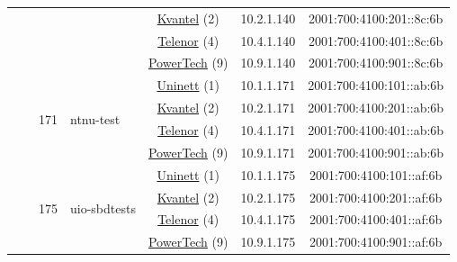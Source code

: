 \begin{small}
\begin{center}
\begin{longtable}{|c|c|c|c|c|c|c|c|}
  &  &  &  & \multicolumn{2}{|c|}{\tiny{\href{http://kvantel.no}{Kvantel} (2)}} & \tiny{10.2.1.140} & \tiny{2001:700:4100:201::8c:6b} \\* \cline{5-5}\cline{6-6}\cline{7-7}\cline{8-8}
  &  &  &  & \multicolumn{2}{|c|}{\tiny{\href{https://www.telenor.no}{Telenor} (4)}} & \tiny{10.4.1.140} & \tiny{2001:700:4100:401::8c:6b} \\* \cline{5-5}\cline{6-6}\cline{7-7}\cline{8-8}
  &  &  &  & \multicolumn{2}{|c|}{\tiny{\href{http://www.powertech.no}{PowerTech} (9)}} & \tiny{10.9.1.140} & \tiny{2001:700:4100:901::8c:6b} \\* \cline{3-3}\cline{4-4}\cline{5-5}\cline{6-6}\cline{7-7}\cline{8-8}
  &  & \multirow{4}{*}{\tiny{171}} & \multicolumn{1}{|l|}{\multirow{4}{*}{\tiny{ntnu-test}}} & \multicolumn{2}{|c|}{\tiny{\href{https://www.uninett.no}{Uninett} (1)}} & \tiny{10.1.1.171} & \tiny{2001:700:4100:101::ab:6b} \\* \cline{5-5}\cline{6-6}\cline{7-7}\cline{8-8}
  &  &  &  & \multicolumn{2}{|c|}{\tiny{\href{http://kvantel.no}{Kvantel} (2)}} & \tiny{10.2.1.171} & \tiny{2001:700:4100:201::ab:6b} \\* \cline{5-5}\cline{6-6}\cline{7-7}\cline{8-8}
  &  &  &  & \multicolumn{2}{|c|}{\tiny{\href{https://www.telenor.no}{Telenor} (4)}} & \tiny{10.4.1.171} & \tiny{2001:700:4100:401::ab:6b} \\* \cline{5-5}\cline{6-6}\cline{7-7}\cline{8-8}
  &  &  &  & \multicolumn{2}{|c|}{\tiny{\href{http://www.powertech.no}{PowerTech} (9)}} & \tiny{10.9.1.171} & \tiny{2001:700:4100:901::ab:6b} \\* \cline{3-3}\cline{4-4}\cline{5-5}\cline{6-6}\cline{7-7}\cline{8-8}
  &  & \multirow{4}{*}{\tiny{175}} & \multicolumn{1}{|l|}{\multirow{4}{*}{\tiny{uio-sbdtests}}} & \multicolumn{2}{|c|}{\tiny{\href{https://www.uninett.no}{Uninett} (1)}} & \tiny{10.1.1.175} & \tiny{2001:700:4100:101::af:6b} \\* \cline{5-5}\cline{6-6}\cline{7-7}\cline{8-8}
  &  &  &  & \multicolumn{2}{|c|}{\tiny{\href{http://kvantel.no}{Kvantel} (2)}} & \tiny{10.2.1.175} & \tiny{2001:700:4100:201::af:6b} \\* \cline{5-5}\cline{6-6}\cline{7-7}\cline{8-8}
  &  &  &  & \multicolumn{2}{|c|}{\tiny{\href{https://www.telenor.no}{Telenor} (4)}} & \tiny{10.4.1.175} & \tiny{2001:700:4100:401::af:6b} \\* \cline{5-5}\cline{6-6}\cline{7-7}\cline{8-8}
  &  &  &  & \multicolumn{2}{|c|}{\tiny{\href{http://www.powertech.no}{PowerTech} (9)}} & \tiny{10.9.1.175} & \tiny{2001:700:4100:901::af:6b} \\* \cline{3-3}\cline{4-4}\cline{5-5}\cline{6-6}\cline{7-7}\cline{8-8}

\end{longtable}
\end{center}
\end{small}
